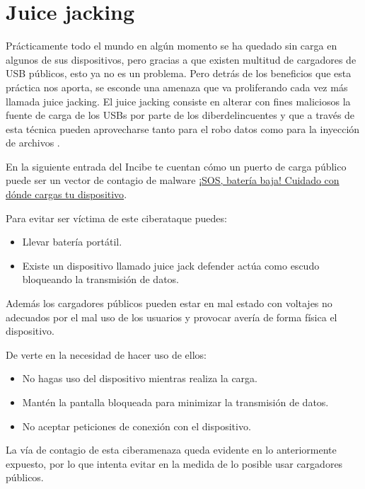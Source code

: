 \documentclass[
  a4paper,
  openany]{book}
\begin{document}
\hypertarget{juice-jacking}{%
\section{Juice jacking}\label{juice-jacking}}

Prácticamente todo el mundo en algún momento se ha quedado sin carga en algunos de sus dispositivos, pero gracias a que existen multitud de cargadores de USB públicos, esto ya no es un problema. Pero detrás de los beneficios que esta práctica nos aporta, se esconde una amenaza que va proliferando cada vez más llamada juice jacking. El juice jacking consiste en alterar con fines maliciosos la fuente de carga de los USBs por parte de los diberdelincuentes y que a través de esta técnica pueden aprovecharse tanto para el robo datos como para la inyección de archivos \citep{ESET-juice-jacking}.

En la siguiente entrada del Incibe te cuentan cómo un puerto de carga público puede ser un vector de contagio de malware \href{https://www.incibe.es/empresas/blog/sos-bateria-baja-cuidado-con-donde-cargas-tu-dispositivo}{¡SOS, batería baja! Cuidado con dónde cargas tu dispositivo}.

Para evitar ser víctima de este ciberataque puedes:

\begin{itemize}
\item
  Llevar batería portátil.
\item
  Existe un dispositivo llamado juice jack defender actúa como escudo bloqueando la transmisión de datos.
\end{itemize}

Además los cargadores públicos pueden estar en mal estado con voltajes no adecuados por el mal uso de los usuarios y provocar avería de forma física el dispositivo.

De verte en la necesidad de hacer uso de ellos:

\begin{itemize}
\item
  No hagas uso del dispositivo mientras realiza la carga.
\item
  Mantén la pantalla bloqueada para minimizar la transmisión de datos.
\item
  No aceptar peticiones de conexión con el dispositivo.
\end{itemize}

La vía de contagio de esta ciberamenaza queda evidente en lo anteriormente expuesto, por lo que intenta evitar en la medida de lo posible usar cargadores públicos.
\end{document}
